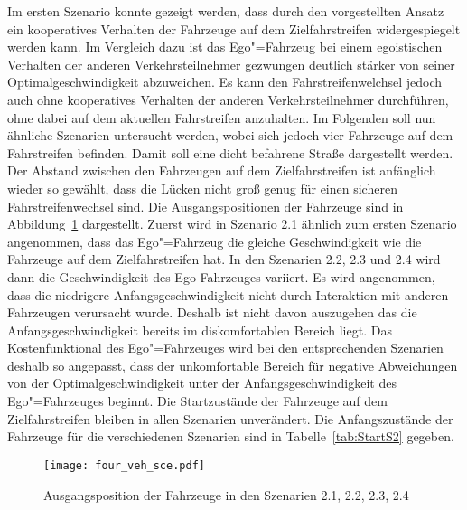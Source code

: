 Im ersten Szenario konnte gezeigt werden, dass durch den vorgestellten Ansatz ein kooperatives Verhalten der Fahrzeuge auf dem Zielfahrstreifen widergespiegelt werden kann.
Im Vergleich dazu ist das Ego"=Fahrzeug bei einem egoistischen Verhalten der anderen Verkehrsteilnehmer gezwungen deutlich st\"arker von seiner Optimalgeschwindigkeit abzuweichen.
Es kann den Fahrstreifenwelchsel jedoch auch ohne kooperatives Verhalten der anderen Verkehrsteilnehmer durchf\"uhren, ohne dabei auf dem aktuellen Fahrstreifen anzuhalten.
Im Folgenden soll nun \"ahnliche Szenarien untersucht werden, wobei sich jedoch vier Fahrzeuge auf dem Fahrstreifen befinden.
Damit soll eine dicht befahrene Stra{\ss}e dargestellt werden.
Der Abstand zwischen den Fahrzeugen auf dem Zielfahrstreifen ist anf\"anglich wieder so gew\"ahlt, dass die L\"ucken nicht gro{\ss} genug f\"ur einen sicheren Fahrstreifenwechsel sind.
Die Ausgangspositionen der Fahrzeuge sind in Abbildung~\ref{fig:four_veh_scene} dargestellt.
Zuerst wird in Szenario 2.1 \"ahnlich zum ersten Szenario angenommen, dass das Ego"=Fahrzeug die gleiche Geschwindigkeit wie die Fahrzeuge auf dem Zielfahrstreifen hat.
In den Szenarien 2.2, 2.3 und 2.4 wird dann die Geschwindigkeit des Ego-Fahrzeuges variiert.
Es wird angenommen, dass die niedrigere Anfangsgeschwindigkeit nicht durch Interaktion mit anderen Fahrzeugen verursacht wurde.
Deshalb ist nicht davon auszugehen das die Anfangsgeschwindigkeit bereits im diskomfortablen Bereich liegt.
Das Kostenfunktional des Ego"=Fahrzeuges wird bei den entsprechenden Szenarien deshalb so angepasst, dass der unkomfortable Bereich f\"ur negative Abweichungen von der Optimalgeschwindigkeit unter der Anfangsgeschwindigkeit des Ego"=Fahrzeuges beginnt.
Die Startzust\"ande der Fahrzeuge auf dem Zielfahrstreifen bleiben in allen Szenarien unver\"andert.
Die Anfangszust\"ande der Fahrzeuge f\"ur die verschiedenen Szenarien sind in Tabelle~\ref{tab:StartS2} gegeben.

\begin{figure}[!htbp]
    \centering
    \texttt{[image: four\_veh\_sce.pdf]}
    \caption[Szenario 2]{Ausgangsposition der Fahrzeuge in den Szenarien 2.1, 2.2, 2.3, 2.4}
    \label{fig:four_veh_scene} 
\end{figure}


